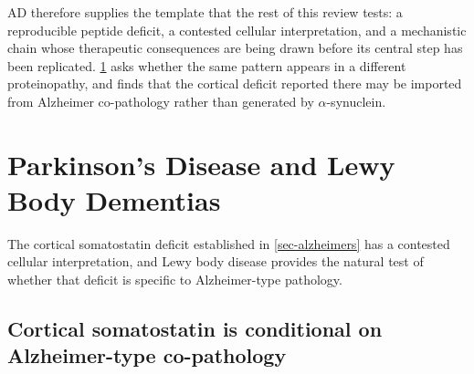\documentclass[11pt]{article}
\begin{document}
AD therefore supplies the template that the rest of this review tests: a reproducible peptide deficit, a contested cellular interpretation, and a mechanistic chain whose therapeutic consequences are being drawn before its central step has been replicated. \ref{sec-parkinsons-lewy-body} asks whether the same pattern appears in a different proteinopathy, and finds that the cortical deficit reported there may be imported from Alzheimer co-pathology rather than generated by $\alpha$-synuclein.

\section{Parkinson's Disease and Lewy Body Dementias}
\label{sec-parkinsons-lewy-body}

The cortical somatostatin deficit established in \ref{sec-alzheimers} has a contested cellular interpretation, and Lewy body disease provides the natural test of whether that deficit is specific to Alzheimer-type pathology.

\subsection{Cortical somatostatin is conditional on Alzheimer-type co-pathology}
\label{sec-05-cortical-copathology}
\end{document}
